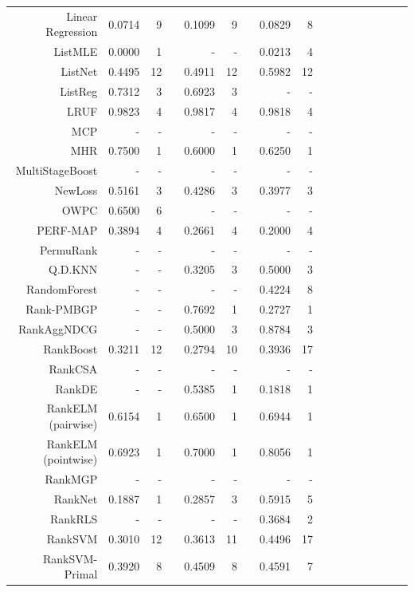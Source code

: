 \documentclass{sig-alternate-2013}
\begin{document}
\begin{longtable}{@{}rrrrrrrrrrrrrrrrr@{}}
Linear Regression & 0.0714 & 9 && 0.1099 & 9 && 0.0829 & 8 && & && & & \\
ListMLE & 0.0000 & 1 && - & - && 0.0213 & 4 && & && & & \\
ListNet & 0.4495 & 12 && 0.4911 & 12 && 0.5982 & 12 && & && & & \\
ListReg & 0.7312 & 3 && 0.6923 & 3 && - & - && & && & & \\
LRUF & 0.9823 & 4 && 0.9817 & 4 && 0.9818 & 4 && & && & & \\
MCP & - & - && - & - && - & - && & && & & \\
MHR & 0.7500 & 1 && 0.6000 & 1 && 0.6250 & 1 && & && & & \\
MultiStageBoost & - & - && - & - && - & - && & && & & \\
NewLoss & 0.5161 & 3 && 0.4286 & 3 && 0.3977 & 3 && & && & & \\
OWPC & 0.6500 & 6 && - & - && - & - && & && & & \\
PERF-MAP & 0.3894 & 4 && 0.2661 & 4 && 0.2000 & 4 && & && & & \\
PermuRank & - & - && - & - && - & - && & && & & \\
Q.D.KNN & - & - && 0.3205 & 3 && 0.5000 & 3 && & && & & \\
RandomForest & - & - && - & - && 0.4224 & 8 && & && & & \\
Rank-PMBGP & - & - && 0.7692 & 1 && 0.2727 & 1 && & && & & \\
RankAggNDCG & - & - && 0.5000 & 3 && 0.8784 & 3 && & && & & \\
RankBoost & 0.3211 & 12 && 0.2794 & 10 && 0.3936 & 17 && & && & & \\
RankCSA & - & - && - & - && - & - && & && & & \\
RankDE & - & - && 0.5385 & 1 && 0.1818 & 1 && & && & & \\
RankELM (pairwise) & 0.6154 & 1 && 0.6500 & 1 && 0.6944 & 1 && & && & & \\
RankELM (pointwise) & 0.6923 & 1 && 0.7000 & 1 && 0.8056 & 1 && & && & & \\
RankMGP & - & - && - & - && - & - && & && & & \\
RankNet & 0.1887 & 1 && 0.2857 & 3 && 0.5915 & 5 && & && & & \\
RankRLS & - & - && - & - && 0.3684 & 2 && & && & & \\
RankSVM & 0.3010 & 12 && 0.3613 & 11 && 0.4496 & 17 && & && & & \\
RankSVM-Primal & 0.3920 & 8 && 0.4509 & 8 && 0.4591 & 7 && & && & & \\

\end{longtable}
\end{document}
